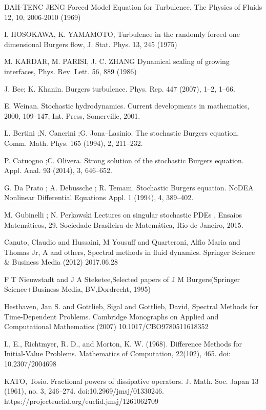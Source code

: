 \begin{thebibliography}{X}
 DAH-TENC JENG Forced Model Equation for Turbulence, The Physics of Fluids 12, 10, 2006-2010 (1969)

 I. HOSOKAWA, K. YAMAMOTO, Turbulence in the randomly forced one dimensional Burgers flow, J. Stat. Phys. 13, 245 (1975)

 M. KARDAR, M. PARISI, J. C. ZHANG Dynamical scaling of growing interfaces, Phys. Rev. Lett. 56, 889 (1986)

 J. Bec; K. Khanin. Burgers turbulence. Phys. Rep. 447 (2007), 1–2, 1–66.

 E. Weinan. Stochastic hydrodynamics. Current developments in mathematics, 2000, 109–147, Int. Press, Somerville, 2001.

 L. Bertini ;N. Cancrini ;G. Jona–Lasinio. The stochastic Burgers equation. Comm. Math. Phys. 165 (1994), 2, 211–232.

 P. Catuogno ;C. Olivera. Strong solution of the stochastic Burgers equation. Appl. Anal. 93 (2014), 3, 646–652.

 G. Da Prato ; A. Debussche ; R. Temam. Stochastic Burgers equation. NoDEA Nonlinear Differential Equations Appl. 1 (1994), 4, 389–402.

 M. Gubinelli ; N. Perkowski Lectures on singular stochastic PDEs , Ensaios Matemáticos, 29. Sociedade Brasileira de Matemática, Rio de
Janeiro, 2015.

 Canuto, Claudio and Hussaini, M Yousuff and Quarteroni, Alfio Maria and Thomas Jr, A and others, Spectral methods in fluid dynamics. Springer Science \& Business Media (2012) 2017.06.28

  F T Nieuwstadt and J A Steketee,Selected papers of J M Burgers(Springer Science+Business Media, BV,Dordrecht, 1995)


 Hesthaven, Jan S. and Gottlieb, Sigal and Gottlieb, David, Spectral Methods for Time-Dependent Problems. Cambridge Monographs on Applied and Computational Mathematics (2007) 10.1017/CBO9780511618352

 I., E., Richtmyer, R. D., and Morton, K. W. (1968). Difference Methods for Initial-Value Problems. Mathematics of Computation, 22(102), 465. doi: 10.2307/2004698

 KATO, Tosio. Fractional powers of dissipative operators. J. Math. Soc. Japan 13 (1961), no. 3, 246--274. doi:10.2969/jmsj/01330246. https://projecteuclid.org/euclid.jmsj/1261062709


\end{thebibliography}
